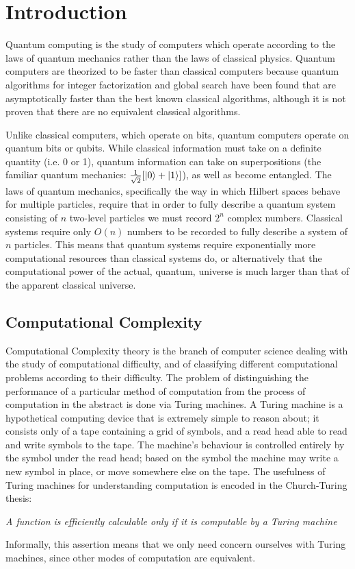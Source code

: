 \chapter{Introduction}
Quantum computing is the study of computers which operate according to the laws of quantum mechanics rather than the laws of classical physics.  Quantum computers are theorized to be faster than classical computers because quantum algorithms for integer factorization\cite{shor} and global search\cite{grover} have been found that are asymptotically faster than the best known classical algorithms, although it is not proven that there are no equivalent classical algorithms.

Unlike classical computers, which operate on bits, quantum computers operate on quantum bits or qubits.  While classical information must take on a definite quantity (i.e. 0 or 1), quantum information can take on superpositions (the familiar quantum mechanics: $\frac{1}{\sqrt{2}}[\mathinner{|{0}\rangle} + \mathinner{|{1}\rangle}]$), as well as become entangled.  The laws of quantum mechanics, specifically the way in which Hilbert spaces behave for multiple particles, require that in order to fully describe a quantum system consisting of $n$ two-level particles we must record $2^n$ complex numbers.  Classical systems require only $O(n)$ numbers to be recorded to fully describe a system of $n$ particles.  This means that quantum systems require exponentially more computational resources than classical systems do, or alternatively that the computational power of the actual, quantum, universe is much larger than that of the apparent classical universe.

\section{Computational Complexity}
\label{sec:complex}
Computational Complexity theory is the branch of computer science dealing with the study of computational difficulty, and of classifying different computational problems according to their difficulty.  The problem of distinguishing the performance of a particular method of computation from the process of computation in the abstract is done via Turing machines.\cite{turing}  A Turing machine is a hypothetical computing device that is extremely simple to reason about; it consists only of a tape containing a grid of symbols, and a read head able to read and write symbols to the tape.  The machine's behaviour is controlled entirely by the symbol under the read head; based on the symbol the machine may write a new symbol in place, or move somewhere else on the tape.  The usefulness of Turing machines for understanding computation is encoded in the Church-Turing thesis:
\begin{center}
	\emph{A function is efficiently calculable only if it is computable by a Turing machine}
\end{center}
Informally, this assertion means that we only need concern ourselves with Turing machines, since other modes of computation are equivalent.

